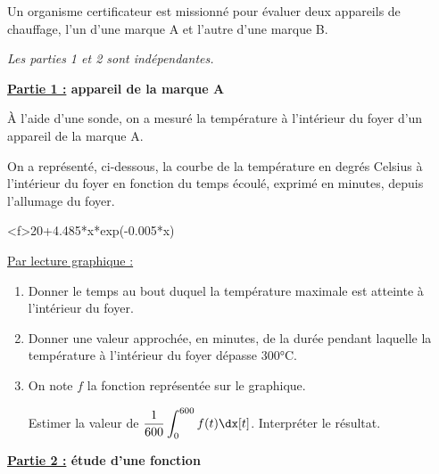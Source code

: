 Un organisme certificateur est missionné pour évaluer deux appareils de chauffage, l’un d’une marque A et l’autre d’une marque B.

\begin{Centrage}
	\textit{Les parties 1 et 2 sont indépendantes.}
\end{Centrage}

\medskip

\textbf{\underline{Partie 1 :} appareil de la marque A}

\medskip

À l’aide d’une sonde, on a mesuré la température à l’intérieur du foyer d’un appareil de la marque A.

On a représenté, ci-dessous, la courbe de la température en degrés Celsius à l’intérieur du foyer en fonction du temps écoulé, exprimé en minutes, depuis l’allumage du foyer.

\begin{Centrage}
	\begin{GraphiqueTikz}[x=0.01cm,y=0.02cm,Xmin=0,Xmax=1200,Xgrille=50,Xgrilles=50,Ymin=0,Ymax=400,Ygrille=25,Ygrilles=25]
		\DefinirCourbe[Nom=cf,Debut=0,Fin=1200,Trace,Couleur=red]<f>{20+4.485*x*exp(-0.005*x)}
	\end{GraphiqueTikz}
\end{Centrage}

\underline{Par lecture graphique :}

\begin{enumerate}
	\item Donner le temps au bout duquel la température maximale est atteinte à l’intérieur du foyer.
	\item Donner une valeur approchée, en minutes, de la durée pendant laquelle la température à l’intérieur du foyer dépasse 300°C.
	\item On note $f$ la fonction représentée sur le graphique.
	
	Estimer la valeur de $\dfrac{1}{600} \displaystyle\int_0^{600} f(t) \dx[t]$. Interpréter le résultat.
\end{enumerate}

\smallskip

\textbf{\underline{Partie 2 :}  étude d’une fonction}

